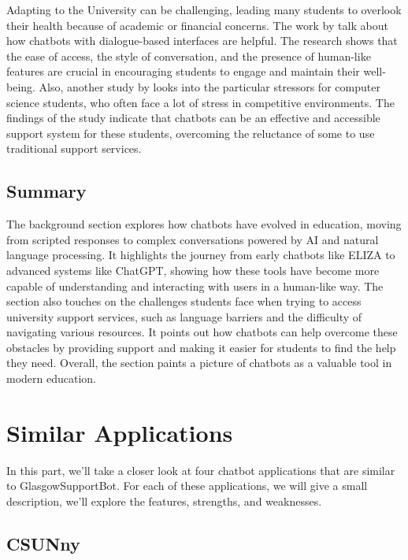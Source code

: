 \documentclass{l4proj}
\begin{document}
Adapting to the University can be challenging, leading many students to overlook their health because of academic or financial concerns. The work by \cite{kettle2023user} talk about how chatbots with dialogue-based interfaces are helpful. The research shows that the ease of access, the style of conversation, and the presence of human-like features are crucial in encouraging students to engage and maintain their well-being. Also, another study by \cite{kumar2022exploring} looks into the particular stressors for computer science students, who often face a lot of stress in competitive environments. The findings of the study
indicate that chatbots can be an effective and accessible support system for these students, overcoming the reluctance of some to use traditional support services.

\subsection{Summary}

The background section explores how chatbots have evolved in education, moving from scripted responses to complex conversations powered by AI and natural language processing. It highlights the journey from early chatbots like ELIZA to advanced systems like ChatGPT, showing how these tools have become more capable of understanding and interacting with users in a human-like way. The section also touches on the challenges students face when trying to access university support services, such as language barriers and the difficulty of navigating various resources. It points out how chatbots can help overcome these obstacles by providing support and making it easier for students to find the help they need. Overall, the section paints a picture of chatbots as a valuable tool in modern education.

\section{Similar Applications}


In this part, we'll take a closer look at four chatbot applications that are similar to GlasgowSupportBot. For each of these applications, we will give a small description, we'll explore the features, strengths, and weaknesses. 

\subsection{CSUNny}
\end{document}
